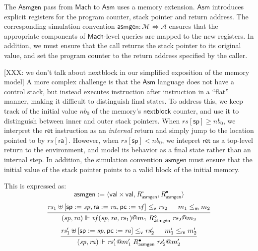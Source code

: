 \documentclass[draft,11pt]{report}
\theoremstyle{definition}
\newcommand{\kw}[1]{\ensuremath{ \mathsf{#1} }}
\newcommand{\que}{\circ}         %
\newcommand{\ans}{\bullet}       %
\newcommand{\vref}{\le_\kw{v}}   %
\newcommand{\mext}{\le_\kw{m}}   %
\begin{document}
The \kw{Asmgen} pass from \kw{Mach} to \kw{Asm}
uses a memory extension.
\kw{Asm} introduces explicit registers for the
program counter, stack pointer and return address.
The corresponding simulation convention
$\kw{asmgen} : \mathcal{M} \Leftrightarrow \mathcal{A}$
ensures that the appropriate components of
\kw{Mach}-level queries are mapped to the new registers.
In addition,
we must ensure that the call returns the stack pointer
to its original value,
and set the program counter to the return address
specified by the caller.

[XXX: we don't talk about nextblock in our simplified
exposition of the memory model]
A more complex challenge is that the $\kw{Asm}$ language
does not have a control stack,
but instead executes instruction after instruction
in a ``flat'' manner,
making it difficult to distinguish final states.
To address this,
we keep track of the initial value $\mathit{nb}_0$ of
the memory's $\kw{nextblock}$ counter,
and use it to distinguish between inner and outer
stack pointers.
When $\mathit{rs}[\kw{sp}] \ge \mathit{nb}_0$,
we interpret the \kw{ret} instruction as an \emph{internal} return
and simply jump to the location pointed to by $\mathit{rs}[\kw{ra}]$.
However, when $\mathit{rs}[\kw{sp}] < \mathit{nb}_0$,
we intepret \kw{ret} as a top-level return to the environment,
and model its behavior as a final state
rather than an internal step.
In addition,
the simulation convention $\kw{asmgen}$
must ensure that the initial value of the stack pointer
points to a valid block of the initial memory.

This is expressed as:
\[
  \kw{asmgen} := \langle \kw{val} \times \kw{val},
    R_\kw{asmgen}^\que, R_\kw{asmgen}^\ans \rangle
\]
\[
  \begin{prooftree}
  \hypo{\mathit{rs}_1 \uplus
    [\kw{sp} := \mathit{sp}, \kw{ra} := \mathit{ra}, \kw{pc} := \mathit{vf}]
    \vref \mathit{rs}_2}
  \hypo{m_1 \mext m_2}
  \infer2{
    (\mathit{sp}, \mathit{ra}) \Vdash
     \mathit{vf}(\mathit{sp}, \mathit{ra}, \mathit{rs}_1)@m_1
     \mathrel{R_\kw{asmgen}^\que}
     \mathit{rs}_2@m_2}
  \end{prooftree}
\]
\[
  \begin{prooftree}
  \hypo{
    \mathit{rs}_1' \uplus [\kw{sp} := \mathit{sp}, \kw{pc} := \mathit{ra}]
    \vref \mathit{rs}_2'}
  \hypo{m_1' \mext m_2'}
  \infer2{
    (\mathit{sp}, \mathit{ra}) \Vdash \mathit{rs}_1'@m_1'
    \mathrel{R_\kw{asmgen}^\ans}
    \mathit{rs}_2'@m_2'}
  \end{prooftree}
\]
\end{document}

